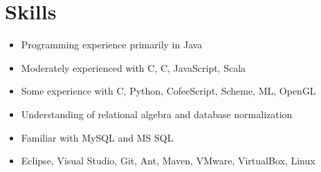 \documentclass[12pt,letterpaper,sans]{moderncv}
\newcommand{\cpp}
    {C\nolinebreak\hspace{-0.05em}\raisebox{0.4ex}{\textbf{\scriptsize+}}\nolinebreak\hspace{-0.10em}\raisebox{0.4ex}{\textbf{\scriptsize+}}}
\newcommand{\csharp}
    {C\nolinebreak\hspace{-.05em}\raisebox{0.4ex}{\small\#}}
\begin{document}
\section{Skills}
    {\begin{itemize}
        \item Programming experience primarily in Java
        \item Moderately experienced with C, \csharp, JavaScript, Scala
        \item Some experience with \cpp, Python, CofeeScript, Scheme, ML, OpenGL
    \end{itemize}}\vspace*{-\baselineskip}
    {\begin{itemize}
        \item Understanding of relational algebra and database normalization
        \item Familiar with MySQL and MS SQL
    \end{itemize}}\vspace*{-\baselineskip}
    {\begin{itemize}
        \item Eclipse, Visual Studio, Git, Ant, Maven, VMware, VirtualBox, Linux
    \end{itemize}}\vspace*{-\baselineskip}
\end{document}
